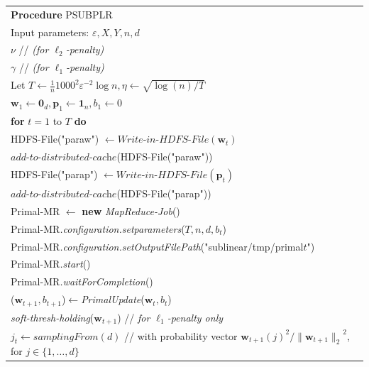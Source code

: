 \documentclass{llncs}
\newcommand{\bw}{\mathbf{w}}
\newcommand{\bp}{\mathbf{p}}
\newcommand{\lc}{\left(}
\newcommand{\rc}{\right)}
\newcommand{\lj}{\lc j\rc}
\newcommand{\tspace}{\hspace*{2em}}
\begin{document}
	\begin{table}[ht]
	\begin{tabular}{l}
	\hline\noalign{\smallskip}
	\textbf{Procedure} PSUBPLR \\
	\noalign{\smallskip}
	\hline
	\noalign{\smallskip}
        Input parameters: $\varepsilon, X, Y, n, d$ \\
        \hspace*{7.8em} $\nu$ // \textsl{(for $\ell_2$-penalty)} \\
        \hspace*{7.8em} $\gamma$ // \textsl{(for $\ell_1$-penalty)} \\
        Let $T\leftarrow\frac{1}{n}{1000}^{2}{\varepsilon}^{-2}\log n, \eta\leftarrow\sqrt{\log\lc n\rc/T}$ \\
        \hspace*{1.5em} ${\bw}_{1}\leftarrow{\mathbf{0}}_{d}, {\mathbf{\bp}}_{1}\leftarrow{\mathbf{1}}_{n}, {b}_{1}\leftarrow 0$\\
		\textbf{for} $t=1$ to $T$ \textbf{do} \\
        \tspace HDFS-File("paraw") $\leftarrow \textit{Write-in-HDFS-File}(\bw_t)$ \\
        \tspace $\textit{add-to-distributed-cache}$(HDFS-File("paraw"))   \\
        \tspace HDFS-File("parap") $\leftarrow \textit{Write-in-HDFS-File}(\bp_t)$ \\
        \tspace $\textit{add-to-distributed-cache}$(HDFS-File("parap"))   \\
		\tspace Primal-MR $\leftarrow$ \textbf{new} \textit{MapReduce-Job}() \\
        \tspace Primal-MR\textit{.configuration.setparameters}($T, n, d, b_t$) \\
        \tspace Primal-MR\textit{.configuration.setOutputFilePath}("sublinear/tmp/primal$t$") \\
        \tspace Primal-MR\textit{.start}() \\ 
        \tspace Primal-MR\textit{.waitForCompletion}() \\
        \tspace ($\bw_{t+1}, b_{t+1}$)$\leftarrow$\textit{PrimalUpdate}($\bw_t, b_t$) \\
        \tspace \textit{soft-thresh-holding}($\bw_{t+1}$) // \textsl{for $\ell_1$-penalty only} \\
        \tspace $j_t \leftarrow \textit{samplingFrom}(d)$ // with probability vector ${{\bw}_{t+1}\lj}^{2}/{\|{\bw}_{t+1}\|_2}^{2}$, for $j\in \{1,\ldots, d\}$ \\

\end{tabular}
\end{table}
\end{document}
